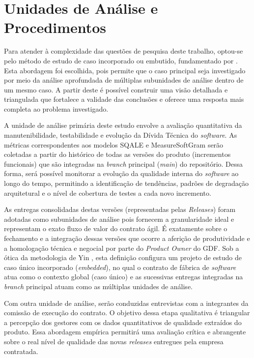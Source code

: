 \section{Unidades de Análise e Procedimentos}

Para atender à complexidade das questões de pesquisa deste trabalho, optou-se pelo método de estudo de caso incorporado ou embutido, fundamentado por . Esta abordagem foi escolhida, pois permite que o caso principal seja investigado por meio da análise aprofundada de múltiplas subunidades de análise dentro de um mesmo caso. A partir deste é possível construir uma visão detalhada e triangulada que fortalece a validade das conclusões e oferece uma resposta mais completa ao problema investigado.

A unidade de análise primária deste estudo envolve a avaliação quantitativa da manutenibilidade, testabilidade e evolução da Dívida Técnica do \textit{software}. As métricas correspondentes aos modelos SQALE e MeasureSoftGram serão coletadas a partir do histórico de todas as versões do produto (incrementos funcionais) que são integradas na \textit{branch} principal (\textit{main}) do repositório. Dessa forma, será possível monitorar a evolução da qualidade interna do \textit{software} ao longo do tempo, permitindo a identificação de tendências, padrões de degradação arquitetural e o nível de cobertura de testes a cada novo incremento. 

As entregas consolidadas destas versões (representadas pelas \textit{Releases}) foram adotadas como subunidades de análise pois fornecem a granularidade ideal e representam o exato fluxo de valor do contrato ágil. É exatamente sobre o fechamento e a integração dessas versões que ocorre a aferição de produtividade e a homologação técnica e negocial por parte do \textit{Product Owner} do GDF. Sob a ótica da metodologia de Yin \cite{yin2001estudo}, esta definição configura um projeto de estudo de caso único incorporado (\textit{embedded}), no qual o contrato de fábrica de \textit{software} atua como o contexto global (caso único) e as sucessivas entregas integradas na \textit{branch} principal atuam como as múltiplas unidades de análise.

Com outra unidade de análise, serão conduzidas entrevistas com a integrantes da  comissão de execução do contrato. O objetivo dessa etapa qualitativa é triangular a percepção dos gestores com os dados quantitativos de qualidade  extraídos do produto. Essa abordagem empírica permitirá uma avaliação crítica e abrangente sobre o real nível de qualidade das novas \textit{releases} entregues pela empresa contratada.

